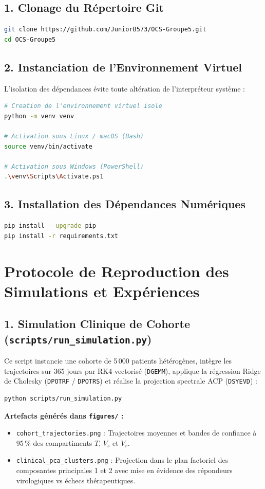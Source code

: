 \documentclass[11pt,a4paper]{report}
\theoremstyle{plain}
\theoremstyle{definition}
\theoremstyle{remark}
\begin{document}
\subsection{1. Clonage du Répertoire Git}
\begin{lstlisting}[language=bash]
git clone https://github.com/JuniorB573/OCS-Groupe5.git
cd OCS-Groupe5
\end{lstlisting}

\subsection{2. Instanciation de l'Environnement Virtuel}
L'isolation des dépendances évite toute altération de l'interpréteur système :
\begin{lstlisting}[language=bash]
# Creation de l'environnement virtuel isole
python -m venv venv

# Activation sous Linux / macOS (Bash)
source venv/bin/activate

# Activation sous Windows (PowerShell)
.\venv\Scripts\Activate.ps1
\end{lstlisting}

\subsection{3. Installation des Dépendances Numériques}
\begin{lstlisting}[language=bash]
pip install --upgrade pip
pip install -r requirements.txt
\end{lstlisting}

\section{Protocole de Reproduction des Simulations et Expériences}

\subsection{1. Simulation Clinique de Cohorte (\texttt{scripts/run\_simulation.py})}
Ce script instancie une cohorte de 5\,000 patients hétérogènes, intègre les trajectoires sur 365 jours par RK4 vectorisé (\texttt{DGEMM}), applique la régression Ridge de Cholesky (\texttt{DPOTRF} / \texttt{DPOTRS}) et réalise la projection spectrale ACP (\texttt{DSYEVD}) :
\begin{lstlisting}[language=bash]
python scripts/run_simulation.py
\end{lstlisting}
\textbf{Artefacts générés dans \texttt{figures/} :}
\begin{itemize}
    \item \texttt{cohort\_trajectories.png} : Trajectoires moyennes et bandes de confiance à 95\,\% des compartiments $T$, $V_s$ et $V_r$.
    \item \texttt{clinical\_pca\_clusters.png} : Projection dans le plan factoriel des composantes principales 1 et 2 avec mise en évidence des répondeurs virologiques vs échecs thérapeutiques.
\end{itemize}
\end{document}
